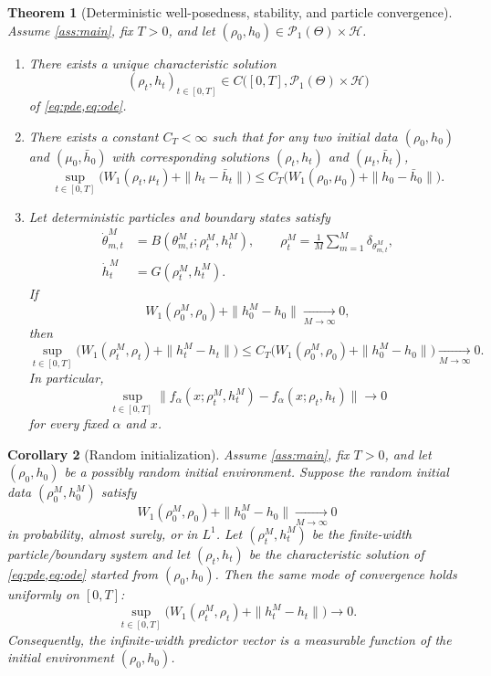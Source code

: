 \documentclass[11pt]{article}
\newtheorem{theorem}{Theorem}[section]
\newtheorem{corollary}[theorem]{Corollary}
\theoremstyle{definition}
\newcommand{\PP}{\mathcal{P}}
\newcommand{\W}{W_1}
\begin{document}
\begin{theorem}[Deterministic well-posedness, stability, and particle convergence]
\label{thm:deterministic}
Assume \cref{ass:main}, fix $T>0$, and let $(\rho_0,h_0)\in\PP_1(\Theta)\times\mathcal H$.

\begin{enumerate}[label=(\roman*),leftmargin=2em]
  \item There exists a unique characteristic solution
  \[
    (\rho_t,h_t)_{t\in[0,T]}
    \in
    C\bigl([0,T],\PP_1(\Theta)\times\mathcal H\bigr)
  \]
  of \cref{eq:pde,eq:ode}.
  \item There exists a constant $C_T<\infty$ such that for any two initial data
  $(\rho_0,h_0)$ and $(\mu_0,\bar h_0)$ with corresponding solutions
  $(\rho_t,h_t)$ and $(\mu_t,\bar h_t)$,
  \begin{equation}
    \sup_{t\in[0,T]}
    \bigl(
      \W(\rho_t,\mu_t)+\|h_t-\bar h_t\|
    \bigr)
    \le
    C_T
    \bigl(
      \W(\rho_0,\mu_0)+\|h_0-\bar h_0\|
    \bigr).
    \label{eq:det-stability}
  \end{equation}
  \item Let deterministic particles and boundary states satisfy
  \begin{align*}
    \dot\theta_{m,t}^M &= B(\theta_{m,t}^M;\rho_t^M,h_t^M),
    \qquad
    \rho_t^M=\frac1M\sum_{m=1}^M\delta_{\theta_{m,t}^M},\\
    \dot h_t^M &= G(\rho_t^M,h_t^M).
  \end{align*}
  If
  \[
    \W(\rho_0^M,\rho_0)+\|h_0^M-h_0\|\xrightarrow[M\to\infty]{}0,
  \]
  then
  \begin{equation}
    \sup_{t\in[0,T]}
    \bigl(
      \W(\rho_t^M,\rho_t)+\|h_t^M-h_t\|
    \bigr)
    \le
    C_T\bigl(\W(\rho_0^M,\rho_0)+\|h_0^M-h_0\|\bigr)
    \xrightarrow[M\to\infty]{}0.
    \label{eq:particle-conv}
  \end{equation}
  In particular,
  \[
    \sup_{t\in[0,T]}
    \|f_\alpha(x;\rho_t^M,h_t^M)-f_\alpha(x;\rho_t,h_t)\|
    \to 0
  \]
  for every fixed $\alpha$ and $x$.
\end{enumerate}
\end{theorem}

\begin{corollary}[Random initialization]
\label{cor:random}
Assume \cref{ass:main}, fix $T>0$, and let $(\rho_0,h_0)$ be a possibly random
initial environment. Suppose the random initial data $(\rho_0^M,h_0^M)$ satisfy
\[
  \W(\rho_0^M,\rho_0)+\|h_0^M-h_0\|\xrightarrow[M\to\infty]{}0
\]
in probability, almost surely, or in $L^1$. Let $(\rho_t^M,h_t^M)$ be the
finite-width particle/boundary system and let $(\rho_t,h_t)$ be the characteristic
solution of \cref{eq:pde,eq:ode} started from $(\rho_0,h_0)$. Then the same mode
of convergence holds uniformly on $[0,T]$:
\[
  \sup_{t\in[0,T]}
  \bigl(
    \W(\rho_t^M,\rho_t)+\|h_t^M-h_t\|
  \bigr)
  \to 0.
\]
Consequently, the infinite-width predictor vector is a measurable function of the
initial environment $(\rho_0,h_0)$.
\end{corollary}
\end{document}
